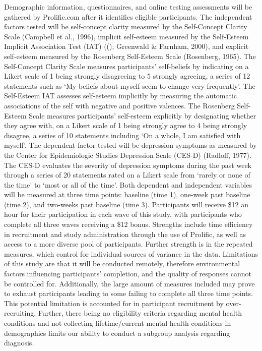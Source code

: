 \documentclass[
  man,
  floatsintext,
  longtable,
  nolmodern,
  notxfonts,
  notimes,
  colorlinks=true,linkcolor=blue,citecolor=blue,urlcolor=blue]{apa7}
\begin{document}
Demographic information, questionnaires, and online testing assessments
will be gathered by Prolific.com after it identifies eligible
participants. The independent factors tested will be self-concept
clarity measured by the Self-Concept Clarity Scale (Campbell et al.,
1996), implicit self-esteem measured by the Self-Esteem Implicit
Association Test (IAT) ((); Greenwald \& Farnham, 2000), and explicit self-esteem
measured by the Rosenberg Self-Esteem Scale (Rosenberg, 1965). The
Self-Concept Clarity Scale measures participants' self-beliefs by
indicating on a Likert scale of 1 being strongly disagreeing to 5
strongly agreeing, a series of 12 statements such as `My beliefs about
myself seem to change very frequently'. The Self-Esteem IAT assesses
self-esteem implicitly by measuring the automatic associations of the
self with negative and positive valences. The Rosenberg Self-Esteem
Scale measures participants' self-esteem explicitly by designating
whether they agree with, on a Likert scale of 1 being strongly agree to
4 being strongly disagree, a series of 10 statements including `On a
whole, I am satisfied with myself'. The dependent factor tested will be
depression symptoms as measured by the Center for Epidemiologic Studies
Depression Scale (CES-D) (Radloff, 1977). The CES-D evaluates the
severity of depression symptoms during the past week through a series of
20 statements rated on a Likert scale from `rarely or none of the time'
to `most or all of the time'. Both dependent and independent variables
will be measured at three time points: baseline (time 1), one-week past
baseline (time 2), and two-weeks past baseline (time 3). Participants
will receive \$12 an hour for their participation in each wave of this
study, with participants who complete all three waves receiving a \$12
bonus. Strengths include time efficiency in recruitment and study
administration through the use of Prolific, as well as access to a more
diverse pool of participants. Further strength is in the repeated
measures, which control for individual sources of variance in the data.
Limitations of this study are that it will be conducted remotely,
therefore environmental factors influencing participants' completion,
and the quality of responses cannot be controlled for. Additionally, the
large amount of measures included may prove to exhaust participants
leading to some failing to complete all three time points. This
potential limitation is accounted for in participant recruitment by
over-recruiting. Further, there being no eligibility criteria regarding
mental health conditions and not collecting lifetime/current mental
health conditions in demographics limits our ability to conduct a
subgroup analysis regarding diagnosis.
\end{document}
